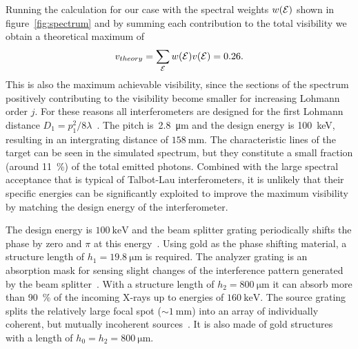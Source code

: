 Running the calculation for our case with the spectral weights $w(\mathcal{E})$ shown in
figure~\ref{fig:spectrum} and by summing each contribution to the total
visibility we obtain a theoretical maximum of
\begin{equation}
    v_{theory} = \sum_{\mathcal{E}} w(\mathcal{E})v(\mathcal{E}) = 0.26.
    \label{eq:maximum.visibility}
\end{equation}
This is also the maximum achievable visibility, since the sections of the
spectrum positively contributing to the visibility become smaller for
increasing Lohmann order $j$.
For these reasons all interferometers are designed for the first Lohmann
distance $D_1 = p_1^2 / 8 \lambda$~\parencite{Weitkamp2005}. The pitch
is~\SI{2.8}{\micro\meter} and the design energy is \SI{100}{\kilo\eV}, resulting in an
intergrating distance of $\SI{158}{\milli\metre}$.
The characteristic lines of the target can be seen in the simulated
spectrum, but they constitute a small fraction (around \SI{11}{\percent}) of
the total emitted photons. Combined with the large spectral acceptance that
is typical of Talbot-Lau interferometers, it is unlikely that their specific energies
can be significantly exploited to improve the maximum visibility by matching
the design energy of the interferometer.

The design energy is $\SI{100}{\kilo\electronvolt}$ and the beam splitter
grating periodically shifts the phase by zero and $\pi$ at this
energy~\parencite{David_2002}. Using
gold as the phase shifting material, a structure length of
$h_1 = \SI{19.8}{\micro \metre}$ is required. The analyzer grating is an absorption mask
for sensing slight changes of the interference pattern generated by the beam
splitter~\parencite{Momose2003a}. With a structure length of $h_2 =
\SI{800}{\micro \metre}$
it can absorb more than \SI{90}{\percent} of the incoming X-rays up to energies of 
$\SI{160}{\kilo\electronvolt}$.
The source grating splits the relatively large focal spot ($\sim
\SI{1}{\milli\metre}$) into an array of individually coherent, but mutually
incoherent sources~\parencite{Pfeiffer2006}. It is also made of gold structures
with a length of $h_0 = h_2 = \SI{800}{\micro \metre}$.

